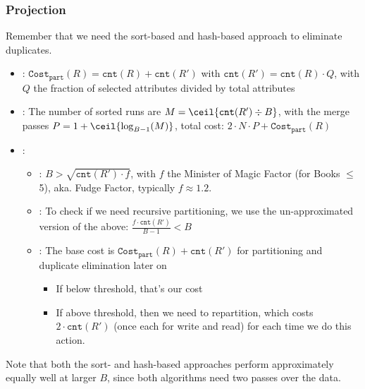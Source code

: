 \subsubsection{Projection}
Remember that we need the sort-based and hash-based approach to eliminate duplicates.
\begin{itemize}
    \item {}: $\texttt{Cost}_\texttt{part}(R) = \texttt{cnt}(R) + \texttt{cnt}(R')$ with
          $\texttt{cnt}(R') = \texttt{cnt}(R) \cdot Q$, with $Q$ the fraction of selected attributes divided by total attributes
    \item {}: The number of sorted runs are $M = \ceil{\texttt{cnt}(R') \div B}$, with the merge passes $P = 1 + \ceil{\log_{B - 1}(M)}$, total cost:
          $2 \cdot N \cdot P + \texttt{Cost}_\texttt{part}(R)$
    \item {}:
          \begin{itemize}
              \item {}: $B > \sqrt{\texttt{cnt}(R') \cdot f}$, with $f$ the Minister of Magic Factor (for Books $\leq$ 5),
                    aka. Fudge Factor, typically $f \approx 1.2$.
              \item {}: To check if we need recursive partitioning, we use the un-approximated version of the above: $\frac{f \cdot \texttt{cnt}(R')}{B - 1} < B$
              \item {}: The base cost is $\texttt{Cost}_\texttt{part}(R) + \texttt{cnt}(R')$ for partitioning and duplicate elimination later on
                    \begin{itemize}
                        \item If below threshold, that's our cost
                        \item If above threshold, then we need to repartition, which costs $2 \cdot \texttt{cnt}(R')$ (once each for write and read) for each time we do this action.
                    \end{itemize}
          \end{itemize}
\end{itemize}
Note that both the sort- and hash-based approaches perform approximately equally well at larger $B$, since both algorithms need two passes over the data.
